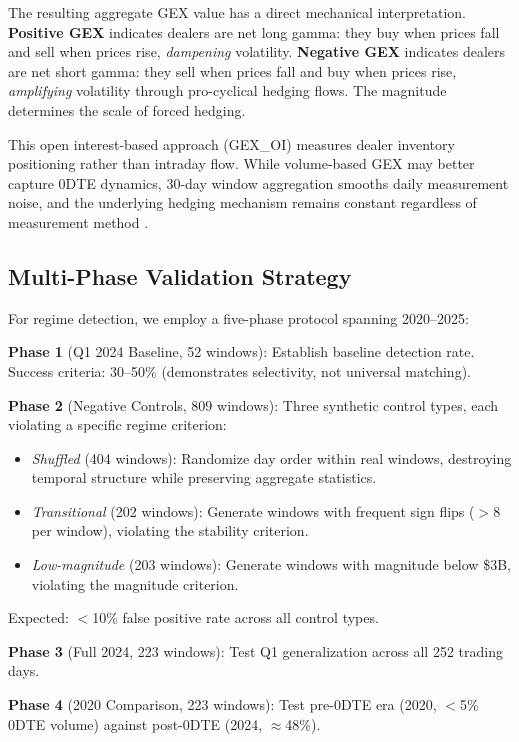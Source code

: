 The resulting aggregate GEX value has a direct mechanical interpretation. \textbf{Positive GEX} indicates dealers are net long gamma: they buy when prices fall and sell when prices rise, \textit{dampening} volatility. \textbf{Negative GEX} indicates dealers are net short gamma: they sell when prices fall and buy when prices rise, \textit{amplifying} volatility through pro-cyclical hedging flows. The magnitude determines the scale of forced hedging.

This open interest-based approach (GEX\_OI) measures dealer inventory positioning rather than intraday flow. While volume-based GEX may better capture 0DTE dynamics, 30-day window aggregation smooths daily measurement noise, and the underlying hedging mechanism remains constant regardless of measurement method \citep{dim2025zero}.

\subsection{Multi-Phase Validation Strategy}

For regime detection, we employ a five-phase protocol spanning 2020--2025:

\textbf{Phase 1} (Q1 2024 Baseline, 52 windows): Establish baseline detection rate. Success criteria: 30--50\% (demonstrates selectivity, not universal matching).

\textbf{Phase 2} (Negative Controls, 809 windows): Three synthetic control types, each violating a specific regime criterion:
\begin{itemize}
    \item \textit{Shuffled} (404 windows): Randomize day order within real windows, destroying temporal structure while preserving aggregate statistics.
    \item \textit{Transitional} (202 windows): Generate windows with frequent sign flips ($>$8 per window), violating the stability criterion.
    \item \textit{Low-magnitude} (203 windows): Generate windows with magnitude below \$3B, violating the magnitude criterion.
\end{itemize}
Expected: $<$10\% false positive rate across all control types.

\textbf{Phase 3} (Full 2024, 223 windows): Test Q1 generalization across all 252 trading days.

\textbf{Phase 4} (2020 Comparison, 223 windows): Test pre-0DTE era (2020, $<$5\% 0DTE volume) against post-0DTE (2024, $\approx$48\%).

